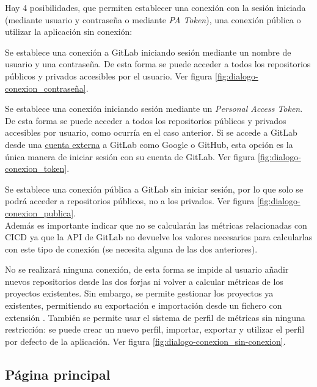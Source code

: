 Hay 4 posibilidades, que permiten establecer una conexión con la sesión iniciada (mediante usuario y contraseña o mediante \textit{PA Token}), una conexión pública o utilizar la aplicación sin conexión:
\begin{description}
	\tightlist
	\item[Iniciar sesión en GitLab mediante usuario y contraseña.] Se establece una conexión a GitLab iniciando sesión mediante un nombre de usuario y una contraseña. De esta forma se puede acceder a todos los repositorios públicos y privados accesibles por el usuario. Ver figura \ref{fig:dialogo-conexion_contraseña}.
	\item[Iniciar sesión mediante \textit{Personal Access Token}.] Se establece una conexión iniciando sesión mediante un \textit{Personal Access Token}. De esta forma se puede acceder a todos los repositorios públicos y privados accesibles por usuario, como ocurría en el caso anterior. 
	Si se accede a GitLab desde una \underline{cuenta externa} a GitLab como Google o GitHub, esta opción es la única manera de iniciar sesión con su cuenta de GitLab. Ver figura \ref{fig:dialogo-conexion_token}.\\
	\item[Usar una conexión pública hacia GitLab.] Se establece una conexión pública a GitLab sin iniciar sesión, por lo que solo se podrá acceder a repositorios públicos, no a los privados. Ver figura \ref{fig:dialogo-conexion_publica}.\\
	Además es importante indicar que no se calcularán las métricas relacionadas con CICD ya que la API de GitLab no devuelve los valores necesarios para calcularlas con este tipo de conexión (se necesita alguna de las dos anteriores).
	\item[No utilizar ninguna conexión.] No se realizará ninguna conexión, de esta forma se impide al usuario añadir nuevos repositorios desde las dos forjas ni volver a calcular métricas de los proyectos existentes. Sin embargo, se permite gestionar los proyectos ya existentes, permitiendo su exportación e importación desde un fichero con extensión . También se permite usar el sistema de perfil de métricas sin ninguna restricción: se puede crear un nuevo perfil, importar, exportar y utilizar el perfil por defecto de la aplicación. Ver figura \ref{fig:dialogo-conexion_sin-conexion}.
\end{description}

\newpage
\subsection{Página principal}

